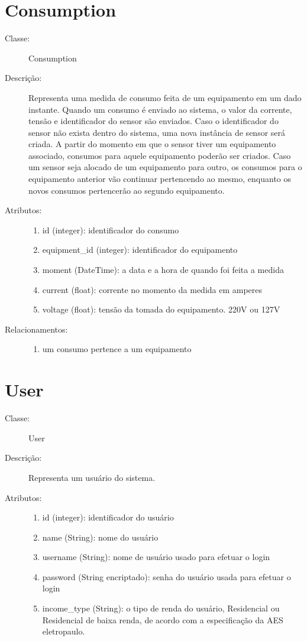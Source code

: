 \section{Consumption}
\begin{description}
  \item[Classe:] Consumption
  \item[Descrição:] Representa uma medida de consumo feita de um equipamento em um dado instante. Quando um consumo é enviado ao sistema, o valor da corrente, tensão e identificador do sensor são enviados. Caso o identificador do sensor não exista dentro do sistema, uma nova instância de sensor será criada. A partir do momento em que o sensor tiver um equipamento associado, consumos para aquele equipamento poderão ser criados. Caso um sensor seja alocado de um equipamento para outro, os consumos para o equipamento anterior vão continuar pertencendo ao mesmo, enquanto os novos consumos pertencerão ao segundo equipamento.
  \item[Atributos:] \hfill
    \begin{enumerate}
      \item id (integer): identificador do consumo
      \item equipment\_id (integer): identificador do equipamento
      \item moment (DateTime): a data e a hora de quando foi feita a medida
      \item current (float): corrente no momento da medida em amperes
      \item voltage (float): tensão da tomada do equipamento. 220V ou 127V
    \end{enumerate}
  \item[Relacionamentos:] \hfill
    \begin{enumerate}
      \item um consumo pertence a um equipamento
    \end{enumerate}
\end{description} 
%
\section{User}
\begin{description}
  \item[Classe:] User
  \item[Descrição:] Representa um usuário do sistema. 
  \item[Atributos:] \hfill
    \begin{enumerate}
      \item id (integer): identificador do usuário
      \item name (String):  nome do usuário
      \item username (String): nome de usuário usado para efetuar o login
      \item password (String encriptado): senha do usuário usada para efetuar o login
        \item income\_type (String): o tipo de renda do usuário, Residencial ou Residencial de baixa renda, de acordo com a especificação da AES eletropaulo.
    \end{enumerate}
\end{description} 
%
